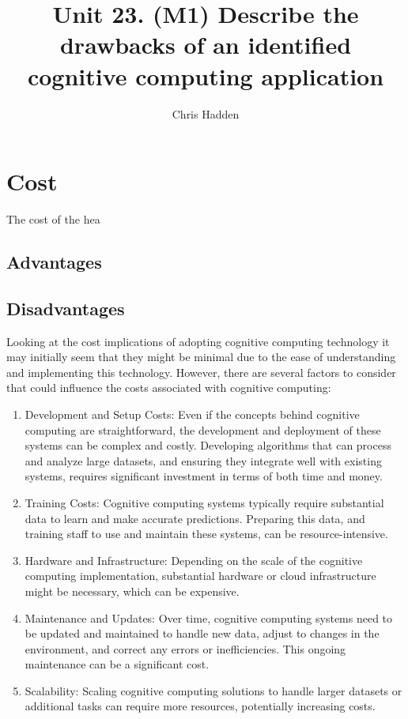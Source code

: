 \documentclass{article}
\title{Unit 23. (M1) Describe the drawbacks of an identified cognitive computing application}
\author{Chris Hadden}
\date{}
\begin{document}
\maketitle

\section{Cost}
The cost of the hea

\subsection{Advantages}

\subsection{Disadvantages}
Looking at the cost implications of adopting cognitive computing technology it may initially seem that they might be minimal due to the ease of understanding and implementing this technology. However, there are several factors to consider that could influence the costs associated with cognitive computing:

\begin{enumerate}
\item Development and Setup Costs: Even if the concepts behind cognitive computing are straightforward, the development and deployment of these systems can be complex and costly. Developing algorithms that can process and analyze large datasets, and ensuring they integrate well with existing systems, requires significant investment in terms of both time and money.

\item Training Costs: Cognitive computing systems typically require substantial data to learn and make accurate predictions. Preparing this data, and training staff to use and maintain these systems, can be resource-intensive.

\item Hardware and Infrastructure: Depending on the scale of the cognitive computing implementation, substantial hardware or cloud infrastructure might be necessary, which can be expensive.

\item Maintenance and Updates: Over time, cognitive computing systems need to be updated and maintained to handle new data, adjust to changes in the environment, and correct any errors or inefficiencies. This ongoing maintenance can be a significant cost.

\item Scalability: Scaling cognitive computing solutions to handle larger datasets or additional tasks can require more resources, potentially increasing costs.
\end{enumerate}
\end{document}
